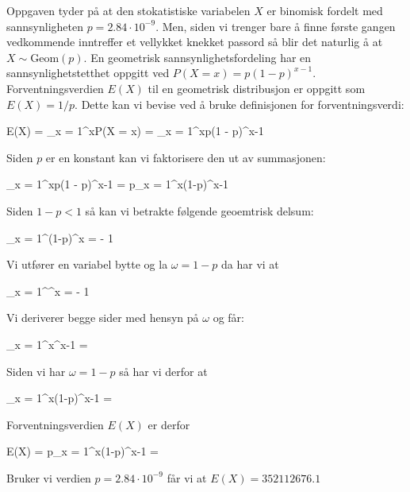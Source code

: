 \oppgave
Oppgaven tyder på at den stokatistiske variabelen $X$ er binomisk fordelt med sannsynligheten $p = 2.84\cdot 10^{-9}$. Men, siden vi trenger bare å finne første gangen vedkommende inntreffer et vellykket knekket passord så blir det naturlig å at $X \sim \mathrm{Geom}(p)$. En geometrisk sannsynlighetsfordeling har en sannsynlighetstetthet oppgitt ved $P(X = x) = p(1-p)^{x-1}$. Forventningsverdien $E(X)$ til en geometrisk distribusjon er oppgitt som $E(X) = 1/p$. Dette kan vi bevise ved å bruke definisjonen for forventningsverdi:
\begin{utregning}
	E(X) = \sum_{x = 1}^\infty xP(X = x) = \sum_{x = 1}^\infty xp(1 - p)^{x-1}
\end{utregning}
Siden $p$ er en konstant kan vi faktorisere den ut av summasjonen:
\begin{utregning}
	\sum_{x = 1}^\infty xp(1 - p)^{x-1} = p\sum_{x = 1}^\infty x(1-p)^{x-1}
\end{utregning}
Siden $1 - p < 1$ så kan vi betrakte følgende geoemtrisk delsum:
\begin{utregning}
	\sum_{x = 1}^\infty (1-p)^x =  - 1
\end{utregning}
Vi utfører en variabel bytte og la $\omega = 1-p$ da har vi at
\begin{utregning}
	\sum_{x = 1}^\infty \omega^x =  - 1
\end{utregning}
Vi deriverer begge sider med hensyn på $\omega$ og får:
\begin{utregning}
	\sum_{x = 1}^\infty x\omega^{x-1} = 
\end{utregning}
Siden vi har $\omega = 1 - p$ så har vi derfor at
\begin{utregning}
	\sum_{x = 1}^\infty x(1-p)^{x-1} = 
\end{utregning}
Forventningsverdien $E(X)$ er derfor
\begin{likning}
	E(X) = p\sum_{x = 1}^\infty x(1-p)^{x-1} = 
\end{likning}
Bruker vi verdien $p = 2.84\cdot 10^{-9}$ får vi at $E(X) = 352112676.1$

